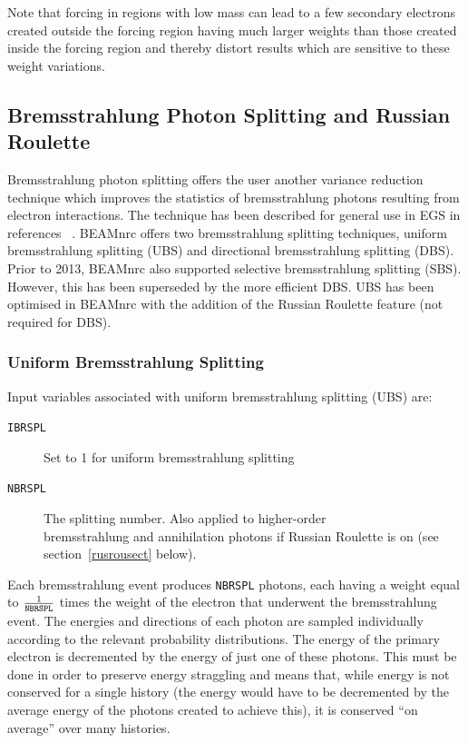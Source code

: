 \documentclass[12pt,twoside]{article}
\begin{document}
Note that forcing in regions with low mass can lead to a few secondary electrons
created outside the forcing region having much larger weights than those created
inside the forcing region and thereby distort results
which are sensitive to these weight variations.

\subsection[Brem Splitting and Russian Roulette]
               {Bremsstrahlung Photon Splitting and Russian Roulette}
\label{bremsection}

Bremsstrahlung photon splitting offers the user another variance
reduction technique which improves the statistics of
bremsstrahlung photons resulting from electron interactions.
The technique has been described for general use in EGS in
references~ \cite{Bi89,RB90}.  BEAMnrc offers two bremsstrahlung splitting
techniques, uniform bremsstrahlung splitting (UBS) and
directional bremsstrahlung splitting (DBS).  Prior to 2013, BEAMnrc
also supported selective bremsstrahlung splitting (SBS).  However,
this has been superseded by the more efficient DBS.  UBS
has been
optimised in BEAMnrc with the addition of the Russian Roulette feature
(not required for DBS).

\subsubsection{Uniform Bremsstrahlung Splitting}

Input variables associated with uniform bremsstrahlung splitting (UBS) are:
\begin{description}
\item [{\tt IBRSPL}] Set to 1 for uniform bremsstrahlung splitting
\item [{\tt NBRSPL}] The splitting number.  Also applied to higher-order\\
bremsstrahlung and annihilation photons if Russian Roulette
is on (see section~\ref{rusrousect} below).
\end{description}

Each bremsstrahlung event produces {\tt NBRSPL} photons, each having a weight
equal to $\frac{1}{{\tt NBRSPL}}$ times the weight of the electron that
underwent the bremsstrahlung event.  The energies and directions of each
photon are sampled individually according to the relevant probability
distributions.  The energy of the primary electron is decremented by
the energy of just one of these photons.  This must be done in order to preserve
energy straggling and means that, while energy is not conserved for a single
history (the energy would have to be decremented by the average energy of the
photons created to achieve this), it is conserved ``on
average'' over many histories.
\end{document}
